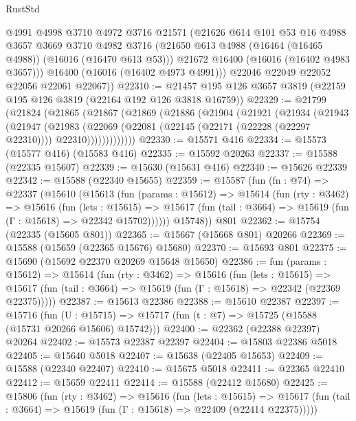 \begin{lexlean}{RustStd}
\begin{coremodule}
          @4991
          @4998
          @3710
          @4972
          @3716
          @21571
          (@21626
            @614
            @101
            @53
            @16
            @4988
            @3657
            @3669
            @3710
            @4982
            @3716
            (@21650 @613 @4988 (@16464 (@16465 @4988)) (@16016 (@16470 @613 @53)))
            @21672
            @16400
            (@16016 (@16402 @4983 @3657)))
          @16400
          (@16016 (@16402 @4973 @4991)))
        @22046
        @22049
        @22052
        @22056
        @22061
        @22067))
@22310 := @21457 @195 @126 @3657 @3819 (@22159 @195 @126 @3819 (@22164 @192 @126 @3818 @16759))
@22329 := @21799
    (@21824
      (@21865
        (@21867
          (@21869
            (@21886
              (@21904
                (@21921
                  (@21934
                    (@21943
                      (@21947
                        (@21983
                          (@22069
                            (@22081 (@22145 (@22171 (@22228 (@22297 @22310)))) @22310)))))))))))))
@22330 := @15571 @416
@22334 := @15573 (@15577 @416) (@15583 @416)
@22335 := @15592 @20263
@22337 := @15588 (@22335 @15607)
@22339 := @15630 (@15631 @416)
@22340 := @15626 @22339
@22342 := @15588 (@22340 @15655)
@22359 := @15587
    (fun (fn : @74) =>
    @22337
      (@15610
        (@15613
          (fun (params : @15612) =>
          @15614
            (fun (rty : @3462) =>
            @15616
              (fun (lets : @15615) =>
              @15617 (fun (tail : @3664) => @15619 (fun (Γ : @15618) => @22342 @15702))))))
        @15748))
    @801
@22362 := @15754 (@22335 (@15605 @801))
@22365 := @15667 (@15668 @801) @20266
@22369 := @15588 (@15659 (@22365 @15676) @15680)
@22370 := @15693 @801
@22375 := @15690 (@15692 @22370 @20269 @15648 @15650)
@22386 := fun (params : @15612) =>
  @15614
    (fun (rty : @3462) =>
    @15616
      (fun (lets : @15615) =>
      @15617 (fun (tail : @3664) => @15619 (fun (Γ : @15618) => @22342 (@22369 @22375)))))
@22387 := @15613 @22386
@22388 := @15610 @22387
@22397 := @15716
    (fun (U : @15715) => @15717 (fun (t : @7) => @15725 (@15588 (@15731 @20266 @15606) @15742)))
@22400 := @22362 (@22388 @22397) @20264
@22402 := @15573 @22387 @22397
@22404 := @15803 @22386 @5018
@22405 := @15640 @5018
@22407 := @15638 (@22405 @15653)
@22409 := @15588 (@22340 @22407)
@22410 := @15675 @5018
@22411 := @22365 @22410
@22412 := @15659 @22411
@22414 := @15588 (@22412 @15680)
@22425 := @15806
    (fun (rty : @3462) =>
    @15616
      (fun (lets : @15615) =>
      @15617 (fun (tail : @3664) => @15619 (fun (Γ : @15618) => @22409 (@22414 @22375)))))

\end{coremodule}
\end{lexlean}
